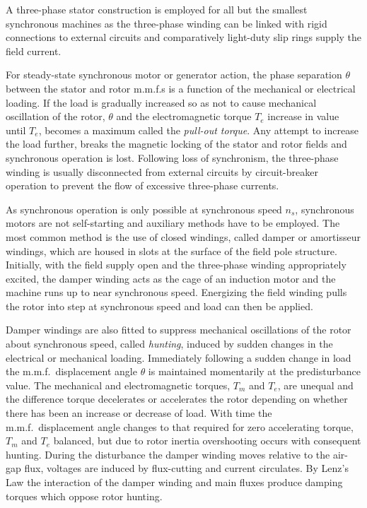 \documentclass[a4paper,numbers=noenddot,12pt]{scrbook}
\begin{document}
        A three-phase stator construction is employed for all but the smallest synchronous machines as the three-phase winding can be linked with rigid connections to external circuits and comparatively light-duty slip rings supply the field current. 

        For steady-state synchronous motor or generator action, the phase separation $\theta$ between the stator and rotor m.m.f.s is a function of the mechanical or electrical loading. If the load is gradually increased so as not to cause mechanical oscillation of the rotor, $\theta$ and the electromagnetic torque $T_e$ increase in value until $T_e$, becomes a maximum called the \textit{pull-out torque}. Any attempt to increase the load further, breaks the magnetic locking of the stator and rotor
        fields and synchronous operation is lost. Following loss of synchronism, the three-phase winding is usually disconnected from external circuits by circuit-breaker operation to prevent the flow of excessive three-phase currents.

        As synchronous operation is only possible at synchronous speed $n_s$, synchronous motors are not self-starting and auxiliary methods have to be employed. The most common method is the use of closed windings, called damper or amortisseur windings, which are housed in slots at the surface of the field pole structure. Initially, with the field supply open and the three-phase winding appropriately excited, the damper winding acts as the cage of an induction motor and the machine runs up to near synchronous speed. Energizing the field winding pulls the rotor into step at synchronous speed and load can then be applied.

        Damper windings are also fitted to suppress mechanical oscillations of the rotor about synchronous speed, called \textit{hunting}, induced by sudden changes in the electrical or mechanical loading. Immediately following a sudden change in load the m.m.f.\ displacement angle $\theta$ is maintained momentarily at the predisturbance value. The mechanical and electromagnetic torques, $T_m$ and $T_e$, are unequal and the difference torque decelerates or accelerates the rotor depending on whether
        there has been an increase or decrease of load. With time the m.m.f.\ displacement angle changes to that required for zero accelerating torque, $T_m$ and $T_e$ balanced, but due to rotor inertia overshooting occurs with consequent hunting. During the disturbance the damper winding moves relative to the air-gap flux, voltages are induced by flux-cutting and current circulates. By Lenz's Law the interaction of the damper winding and main fluxes produce damping torques which oppose rotor hunting.
\end{document}
